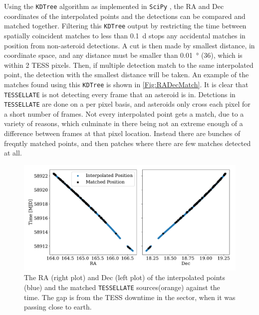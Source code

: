 \documentclass{UCreport}
\begin{document}
Using the \texttt{KDTree} algorithm \citep{Maneewongvatana1999} as implemented in \texttt{SciPy} \citep{2020SciPy-NMeth}, the RA and Dec coordinates of the interpolated points and the detections can be compared and matched together.
Filtering this \texttt{KDTree} output by restricting the time between spatially coincident matches to less than \qty{0.1}{\day} stops any accidental matches in position from non-asteroid detections.
A cut is then made by smallest distance, in coordinate space, and any distance must be smaller than \qty{0.01}{\degree} (\qty{36}{\arcsec}), which is within 2 TESS pixels.
Then, if multiple detection match to the same interpolated point, the detection with the smallest distance will be taken.
An example of the matches found using this \texttt{KDTree} is shown in \autoref{Fig:RADecMatch}.
It is clear that \texttt{TESSELLATE} is not detecting every frame that an asteroid is in.
Detctions in \texttt{TESSELLATE} are done on a per pixel basis, and asteroids only cross each pixel for a short number of frames.
Not every interpolated point gets a match, due to a variety of reasons, which culminate in there being not an extreme enough of a difference between frames at that pixel location.
Instead there are bunches of freqntly matched points, and then patches where there are few matches detected at all.


\begin{figure}[]
  \centering
  \includegraphics[width =\textwidth]{../Test Code/Testing Figures/DetectMatchPos.pdf}
  \caption[Interpolated and Detected Positions]{The RA (right plot) and Dec (left plot) of the interpolated points (blue) and the matched \texttt{TESSELLATE} sources(orange) against the time. The gap is from the TESS downtime in the sector, when it was passing close to earth.}
  \label{Fig:RADecMatch}
\end{figure}
\end{document}
